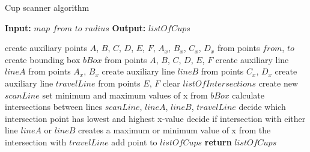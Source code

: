 \begin{algorithm}
\caption{Cup scanner algorithm}\label{alg:cupscanalgo}
\begin{algorithmic}[0]
\State \textbf{Input:}
\State $map$
\State $from$
\State $to$
\State $radius$
\State \textbf{Output:}
\State $listOfCups$
\end{algorithmic}
\begin{algorithmic}[1]
\State create auxiliary points $A$, $B$, $C$, $D$, $E$, $F$, $A_{x}$, $B_{x}$, $C_{x}$, $D_{x}$ from points $from$, $to$
\State create bounding box $bBox$ from points $A$, $B$, $C$, $D$, $E$, $F$
\State create auxiliary line $lineA$ from points $A_{x}$, $B_{x}$
\State create auxiliary line $lineB$ from points $C_{x}$, $D_{x}$
\State create auxiliary line $travelLine$ from points $E$, $F$
	\State clear $listOfIntersections$
	\State create new $scanLine$
	\State set minimum and maximum values of x from $bBox$
	\State calculate intersections between lines $scanLine$, $lineA$, $lineB$, $travelLine$
		\State decide which intersection point has lowest and highest x-value
		\State decide if intersection with either line $lineA$ or $lineB$ creates a maximum or minimum value of x from the intersection with $travelLine$
	\EndIf
			\State add point to $listOfCups$
		\EndIf
	\EndFor
\EndFor
\State \textbf{return} $listOfCups$
\EndFunction
\end{algorithmic}
\end{algorithm}